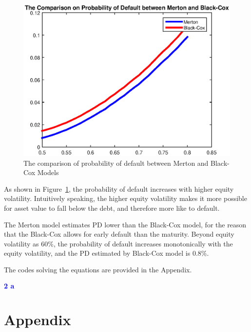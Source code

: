 \documentclass[a4paper,11pt] {article}
\begin{document}
\begin{center}
\begin{figure}
  \centering
  \includegraphics[scale=0.7]{PDs.eps}
  \caption{The comparison of probability of default between Merton and Black-Cox Models}\label{fig::PDs}
\end{figure}
\end{center}

As shown in Figure~\ref{fig::PDs}, the probability of default increases with higher equity volatility. Intuitively speaking, the higher equity volatility makes it more possible for asset value to fall below the debt, and therefore more like to default. 

The Merton model estimates PD lower than the Black-Cox model, for the reason that the Black-Cox allows for early default than the maturity. Beyond equity volatility as 60\%, the probability of default increases monotonically with the equity volatility, and the PD estimated by Black-Cox model is 0.8\%.

The codes solving the equations are provided in the Appendix.

\bigskip

\textcolor{blue}{\bf 2 a}


\section*{Appendix}
\begin{spacing}{0.9}


\end{spacing}
\end{document}
